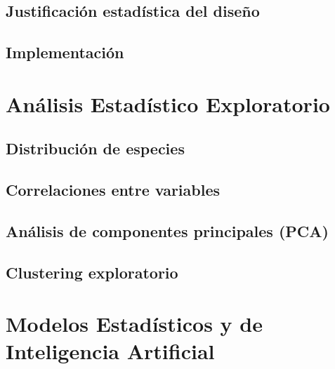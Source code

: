 \documentclass[12pt, a4paper]{article}
\begin{document}
\subsection{Justificación estadística del diseño}

\subsection{Implementación}

\section{Análisis Estadístico Exploratorio}
\label{sec:eda}

\subsection{Distribución de especies}

\subsection{Correlaciones entre variables}

\subsection{Análisis de componentes principales (PCA)}

\subsection{Clustering exploratorio}

\section{Modelos Estadísticos y de Inteligencia Artificial}
\label{sec:modelos}
\end{document}
